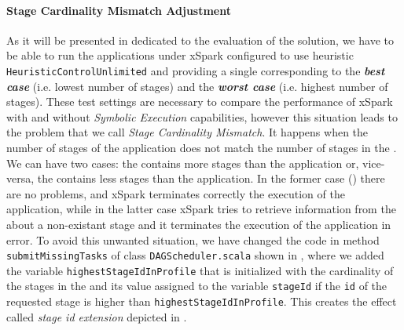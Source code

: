

\paragraph{Stage Cardinality Mismatch Adjustment}
As it will be presented in  dedicated to the evaluation of the solution, we have to be able to run the applications under xSpark configured to use heuristic \texttt{HeuristicControlUnlimited} and providing a single \plan corresponding to the \textbf\textit{best case} (i.e. lowest number of stages) and the \textbf\textit{worst case} (i.e. highest number of stages). These test settings are necessary to compare the performance of xSpark with and without \textit{Symbolic Execution} capabilities, however this situation leads  to the problem that we call \textit{Stage Cardinality Mismatch}. It happens when the number of stages of the application does not match the number of stages in the \plan. We can have two cases: the \plan contains more stages than the application or, vice-versa, the \plan contains less stages than the application. In the former case () there are no problems, and  xSpark terminates correctly the execution of the application, while in the latter case xSpark tries to  retrieve information from the \plan about a non-existant stage and it terminates the execution of the application in error. To avoid this unwanted situation, we have changed the code in method \texttt{submitMissingTasks} of class \texttt{DAGScheduler.scala} shown in , where we added the variable \texttt{highestStageIdInProfile} that is initialized with the cardinality of the stages in the \plan and its value assigned to the variable \texttt{stageId} if the \texttt{id} of the requested stage is higher than \texttt{highestStageIdInProfile}. This creates the effect called \textit{stage id extension} depicted in .
